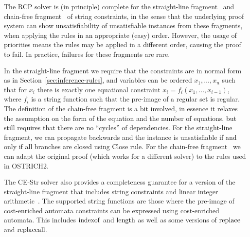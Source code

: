 
The RCP solver is (in principle) complete for %
the straight-line fragment~\cite{ostrich} and chain-free fragment~\cite{chain19} of string constraints,
in the sense that the underlying proof system can show unsatisfiability of unsatisfiable instances from these fragments,
when applying the rules in an appropriate (easy) order.
However, the usage of priorities means the rules may be applied in a different order, causing the proof to fail.
In practice, failures for these fragments are rare.

In the straight-line fragment we require that the constraints are in normal form as in Section~\ref{sec:inference-rules},
and variables can be ordered $x_1, \ldots, x_n$
such that for $x_i$ there is exactly one equational constraint $x_i = f_i(x_1, \ldots, x_{i-1})$,
where $f_{i}$ is a string function such that the pre-image of a regular set is regular.
The definition of the chain-free fragment is a bit involved, in essence it relaxes the assumption on the form of the equation and the number of equations,
but still requires that there are no ``cycles'' of dependencies.
For the straight-line fragment, we can propagate backwards and the instance is unsatisfiable if and only if all branches are closed using Close rule.
For the chain-free fragment~\cite{chain19} we can adapt the original proof (which works for a different solver) to the rules used in OSTRICH2.

The CE-Str solver also provides a completeness guarantee for a version of the straight-line fragment that includes string constraints and linear integer arithmetic~\cite{atva2020}.
The supported string functions are those where the pre-image of cost-enriched automata constraints can be expressed using cost-enriched automata.
This includes $\operatorname{indexof}$ and $\operatorname{length}$ as well as some versions of $\operatorname{replace}$ and $\operatorname{replaceall}$.



